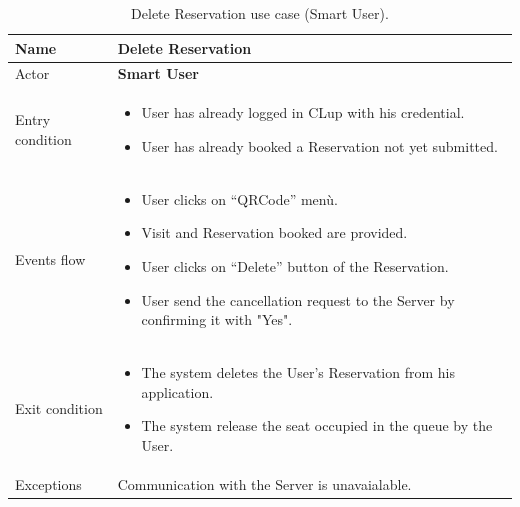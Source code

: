 \begin{table}[H]\begin{tabular}{|p{5cm} | p{7cm} | }
	\hline
	Name & \textbf{Delete Reservation} \\
	\hline
	Actor & \textbf{Smart User} \\
	\hline
	Entry condition &
	\begin{itemize}
		\item User has already logged in CLup with his credential. 
		\item User has already booked a Reservation not yet submitted.
	\end{itemize} \\
	\hline
	Events flow & 
	\begin{itemize}
		\item User clicks on “QRCode” menù.
		\item Visit and Reservation booked are provided.
		\item User clicks on “Delete” button of the Reservation.
		\item User send the cancellation request to the Server by confirming it with "Yes".
	\end{itemize} \\
	\hline
	Exit condition &
	\begin{itemize}	
		\item The system deletes the User's Reservation from his application.
		\item The system release the seat occupied in the queue by the User.
	\end{itemize} \\
	\hline 
	Exceptions & Communication with the Server is unavaialable.\\
	\hline
\end{tabular}
\caption{Delete Reservation use case (Smart User).}
\end{table}

\bigbreak

